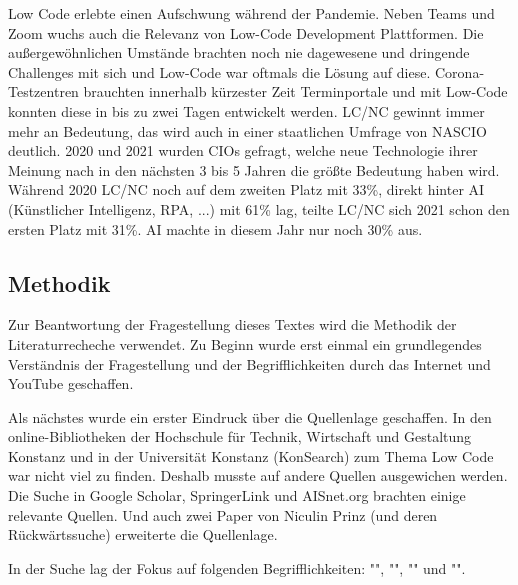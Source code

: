 \documentclass{article}
\begin{document}
	Low Code erlebte einen Aufschwung während der Pandemie. Neben Teams und Zoom wuchs auch die Relevanz von Low-Code Development Plattformen. Die außergewöhnlichen Umstände brachten noch nie dagewesene und dringende Challenges mit sich und Low-Code war oftmals die Lösung auf diese. Corona-Testzentren brauchten innerhalb kürzester Zeit Terminportale und mit Low-Code konnten diese in bis zu zwei Tagen entwickelt werden.
	\cite{AmyGlasscock.2021}
	\newline \newline 
	LC/NC gewinnt immer mehr an Bedeutung, das wird auch in einer staatlichen Umfrage von NASCIO deutlich. 2020 und 2021 wurden CIOs gefragt, welche neue Technologie ihrer Meinung nach in den nächsten 3 bis 5 Jahren die größte Bedeutung haben wird. Während 2020 LC/NC noch auf dem zweiten Platz mit 33\%, direkt hinter AI (Künstlicher Intelligenz, RPA, ...) mit 61\% lag, teilte LC/NC sich 2021 schon den ersten Platz mit 31\%. AI machte in diesem Jahr nur noch 30\% aus.
	\cite{AmyGlasscock.2021}
	
	\subsection{Methodik}
	Zur Beantwortung der Fragestellung dieses Textes wird die Methodik der Literaturrecheche verwendet.
	Zu Beginn wurde erst einmal ein grundlegendes Verständnis der Fragestellung und der Begrifflichkeiten durch das Internet und YouTube geschaffen. %
	 
	Als nächstes wurde ein erster Eindruck über die Quellenlage geschaffen. In den online-Bibliotheken der Hochschule für Technik, Wirtschaft und Gestaltung Konstanz und in der Universität Konstanz (KonSearch) zum Thema Low Code war nicht viel zu finden. Deshalb musste auf andere Quellen ausgewichen werden. \newline
	Die Suche in Google Scholar, SpringerLink und AISnet.org brachten einige relevante Quellen. 
	\newline
	Und auch zwei Paper von Niculin Prinz (und deren Rückwärtssuche) erweiterte die Quellenlage. %
	
	In der Suche lag der Fokus auf folgenden Begrifflichkeiten: "", "", "" und "".
	
	
\end{document}
